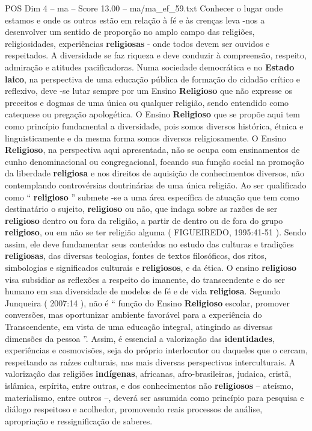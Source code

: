 \begin{textsample}{POS Dim 4 – ma – Score 13.00 – ma/ma\_ef\_59.txt}
Conhecer o lugar onde estamos e onde os outros estão em relação à fé e às crenças leva -nos a desenvolver um sentido de proporção no amplo campo das religiões, religiosidades, experiências \textbf{religiosas} - onde todos devem ser ouvidos e respeitados.
A diversidade se faz riqueza e deve conduzir à compreensão, respeito, admiração e atitudes pacificadoras.
Numa sociedade democrática e no \textbf{Estado} \textbf{laico}, na perspectiva de uma educação pública de formação do cidadão crítico e reflexivo, deve -se lutar sempre por um Ensino \textbf{Religioso} que não expresse os preceitos e dogmas de uma única ou qualquer religião, sendo entendido como catequese ou pregação apologética.
O Ensino \textbf{Religioso} que se propõe aqui tem como princípio fundamental a diversidade, pois somos diversos histórica, étnica e linguisticamente e da mesma forma somos diversos religiosamente.
O Ensino \textbf{Religioso}, na perspectiva aqui apresentada, não se ocupa com ensinamentos de cunho denominacional ou congregacional, focando sua função social na promoção da liberdade \textbf{religiosa} e nos direitos de aquisição de conhecimentos diversos, não contemplando controvérsias doutrinárias de uma única religião.
Ao ser qualificado como “ \textbf{religioso} ” submete -se a uma área específica de atuação que tem como destinatário o sujeito, \textbf{religioso} ou não, que indaga sobre as razões de ser \textbf{religioso} dentro ou fora da religião, a partir de dentro ou de fora do grupo \textbf{religioso}, ou em não se ter religião alguma ( FIGUEIREDO, 1995:41-51 ).
Sendo assim, ele deve fundamentar seus conteúdos no estudo das culturas e tradições \textbf{religiosas}, das diversas teologias, fontes de textos filosóficos, dos ritos, simbologias e significados culturais e \textbf{religiosos}, e da ética.
O ensino \textbf{religioso} visa subsidiar as reflexões a respeito do imanente, do transcendente e do ser humano em sua diversidade de modelos de fé e de vida \textbf{religiosa}.
Segundo Junqueira ( 2007:14 ), não é “ função do Ensino \textbf{Religioso} escolar, promover conversões, mas oportunizar ambiente favorável para a experiência do Transcendente, em vista de uma educação integral, atingindo as diversas dimensões da pessoa ”.
Assim, é essencial a valorização das \textbf{identidades}, experiências e cosmovisões, seja do próprio interlocutor ou daqueles que o cercam, respeitando as raízes culturais, nas mais diversas perspectivas interculturais.
A valorização das religiões \textbf{indígenas}, africanas, afro-brasileiras, judaica, cristã, islâmica, espírita, entre outras, e dos conhecimentos não \textbf{religiosos} – ateísmo, materialismo, entre outros –, deverá ser assumida como princípio para pesquisa e diálogo respeitoso e acolhedor, promovendo reais processos de análise, apropriação e ressignificação de saberes.

\end{textsample}
